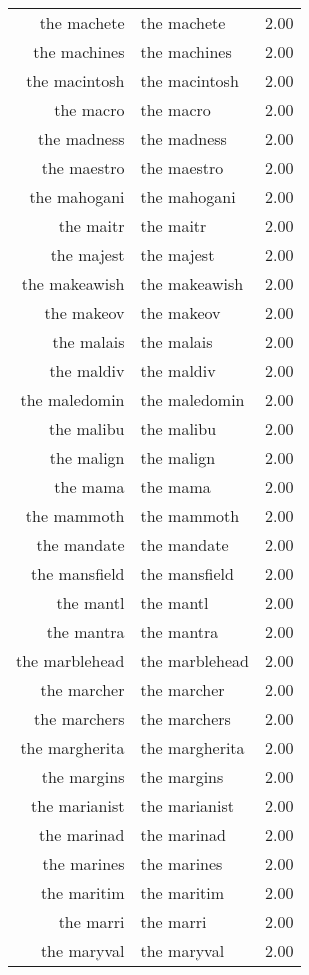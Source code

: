 \begin{table}[ht]
\begin{tabular}{rlr}
  the machete & the machete & 2.00 \\ 
  the machines & the machines & 2.00 \\ 
  the macintosh & the macintosh & 2.00 \\ 
  the macro & the macro & 2.00 \\ 
  the madness & the madness & 2.00 \\ 
  the maestro & the maestro & 2.00 \\ 
  the mahogani & the mahogani & 2.00 \\ 
  the maitr & the maitr & 2.00 \\ 
  the majest & the majest & 2.00 \\ 
  the makeawish & the makeawish & 2.00 \\ 
  the makeov & the makeov & 2.00 \\ 
  the malais & the malais & 2.00 \\ 
  the maldiv & the maldiv & 2.00 \\ 
  the maledomin & the maledomin & 2.00 \\ 
  the malibu & the malibu & 2.00 \\ 
  the malign & the malign & 2.00 \\ 
  the mama & the mama & 2.00 \\ 
  the mammoth & the mammoth & 2.00 \\ 
  the mandate & the mandate & 2.00 \\ 
  the mansfield & the mansfield & 2.00 \\ 
  the mantl & the mantl & 2.00 \\ 
  the mantra & the mantra & 2.00 \\ 
  the marblehead & the marblehead & 2.00 \\ 
  the marcher & the marcher & 2.00 \\ 
  the marchers & the marchers & 2.00 \\ 
  the margherita & the margherita & 2.00 \\ 
  the margins & the margins & 2.00 \\ 
  the marianist & the marianist & 2.00 \\ 
  the marinad & the marinad & 2.00 \\ 
  the marines & the marines & 2.00 \\ 
  the maritim & the maritim & 2.00 \\ 
  the marri & the marri & 2.00 \\ 
  the maryval & the maryval & 2.00 \\ 

\end{tabular}
\end{table}
